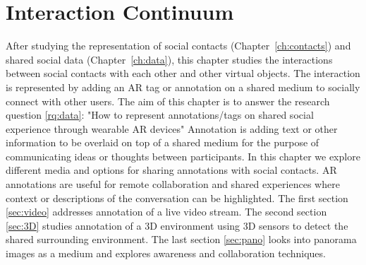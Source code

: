 \chapter{Interaction Continuum} %
\label{ch:annotation} %

After studying the representation of social contacts (Chapter~\ref{ch:contacts}) and shared social data (Chapter~\ref{ch:data}), this chapter studies the interactions between social contacts with each other and other virtual objects. The interaction is represented by adding an AR tag or annotation on a shared medium to socially connect with other users. 
The aim of this chapter is to answer the research question \ref{rq:data}: "How to represent annotations/tags on shared social experience through wearable AR devices"
Annotation is adding text or other information to be overlaid on top of a shared medium for the purpose of communicating ideas or thoughts between participants. In this chapter we explore different media and options for sharing annotations with social contacts. AR annotations are useful for remote collaboration and shared experiences where context or descriptions of the conversation can be highlighted.  
The first section \ref{sec:video} addresses annotation of a live video stream. The second section \ref{sec:3D} studies annotation of a 3D environment using 3D sensors to detect the shared surrounding environment. The last section \ref{sec:pano} looks into panorama images as a medium and explores awareness and collaboration techniques. 





